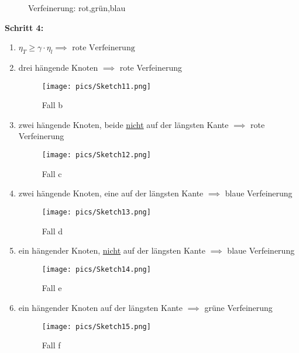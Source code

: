 \begin{figure}[H]
	\center
	
	\caption{Verfeinerung: rot,grün,blau}
	\label{AbbRefinement_types}
\end{figure}	
	
\textbf{Schritt 4:}
\begin{enumerate}[label=\alph*)]
	\item $\eta_T\geq\gamma\cdot\eta_l\implies\text{ rote Verfeinerung}$
	\item drei hängende Knoten $\implies$ rote Verfeinerung
	\begin{figure}[!ht]
		\begin{center}
			\texttt{[image: pics/Sketch11.png]}
			\caption{Fall b}
			\label{AbbVerfeinerungB}
		\end{center}
	\end{figure}
	\item zwei hängende Knoten, beide \underline{nicht} auf der längsten Kante $\implies$ rote Verfeinerung
	\begin{figure}[!ht]
		\begin{center}
			\texttt{[image: pics/Sketch12.png]}
			\caption{Fall c}
			\label{AbbVerfeinerungC}
		\end{center}
	\end{figure}
	\item zwei hängende Knoten, eine auf der längsten Kante $\implies$ blaue Verfeinerung
	\begin{figure}[!ht]
		\begin{center}
			\texttt{[image: pics/Sketch13.png]}
			\caption{Fall d}
			\label{AbbVerfeinerungD}
		\end{center}
	\end{figure}
	\item ein hängender Knoten, \underline{nicht} auf der längsten Kante $\implies$ blaue Verfeinerung
	\begin{figure}[!ht]
		\begin{center}
			\texttt{[image: pics/Sketch14.png]}
			\caption{Fall e}
			\label{AbbVerfeinerungE}
		\end{center}
	\end{figure}
	\item ein hängender Knoten auf der längsten Kante $\implies$ grüne Verfeinerung
	\begin{figure}[!ht]
		\begin{center}
			\texttt{[image: pics/Sketch15.png]}
			\caption{Fall f}
			\label{AbbVerfeinerungF}
		\end{center}
	\end{figure}
\end{enumerate}

